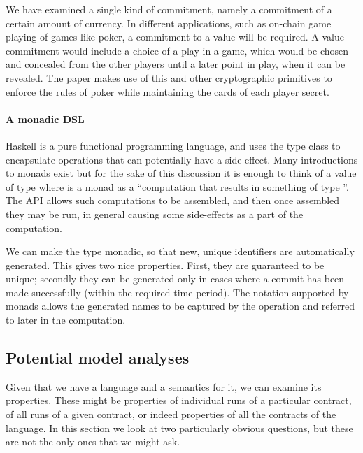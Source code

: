 \documentclass[
      acmsmall
    , screen
    , review=true
  ]{acmart}
\begin{document}
We have examined a single kind of commitment, namely a commitment of a certain amount of currency. In different 
applications, such as on-chain game playing of games like poker, a commitment to a value will be required. A value 
commitment would include a choice of a play in a game, which would be chosen and concealed from the other players until 
a later point in play, when it can be revealed. The paper \cite{kumaresan2015use} makes use of this and other 
cryptographic primitives to enforce the rules of poker while maintaining the cards of each player secret.

\paragraph{A monadic DSL}

Haskell is a pure functional programming language, and uses the  type class to encapsulate operations that can potentially have a side effect. Many introductions to monads exist  but for the sake of this discussion it is enough to think of a value of type  where  is a monad as a ``computation that results in something of type ''. The  API allows such computations to be assembled, and then once assembled they may be run, in general causing some side-effects as a part of the computation.

We can make the  type monadic, so that new, unique identifiers are automatically generated. This gives two nice properties. First, they are guaranteed to be unique; secondly they can be generated only in cases where a commit has been made successfully (within the required time period). The 
 notation supported by monads allows the generated names to be captured by the  operation and referred to later in the computation.


\subsection{Potential model analyses}

Given that we have a language and a semantics for it, we can examine its properties. These might be properties of individual runs of a particular contract, of all runs of a given contract, or indeed properties of all the contracts of the language. In this section we look at two particularly obvious questions, but these are not the only ones that we might ask.
\end{document}
